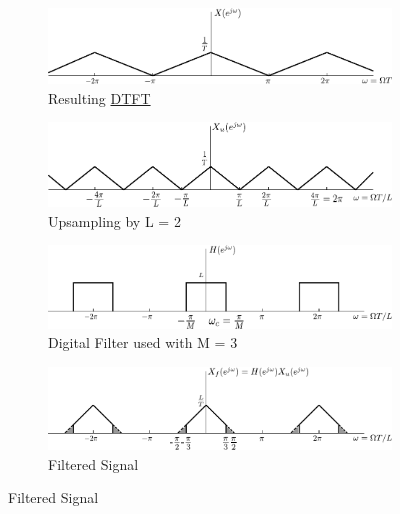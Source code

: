 \begin{figure}[H]	\ContinuedFloat
		\centering
		\begin{subfigure}[b]{\textwidth}
			\centering
			\includegraphics[scale=1]{DTFT_resampler_b.pdf}
			\caption{Resulting \hyperlink{DTFT}{DTFT}}
		\end{subfigure}
\par\bigskip
	\centering
	\begin{subfigure}[b]{\textwidth}
		\centering
		\includegraphics[scale=1]{DTFT_resampler_c.pdf}
		\caption{Upsampling by L = 2}\label{c}
	\end{subfigure}
\par\bigskip
\centering
\begin{subfigure}[b]{\textwidth}
	\centering
	\includegraphics[scale=1]{DTFT_resampler_d.pdf}
	\caption{Digital Filter used with M = 3}
\end{subfigure}
\par\bigskip
\centering
\begin{subfigure}[b]{\textwidth}
	\centering
	\includegraphics[scale=1]{DTFT_resampler_e.pdf}
	\caption{Filtered Signal}\label{e}
\end{subfigure}

\end{figure}
